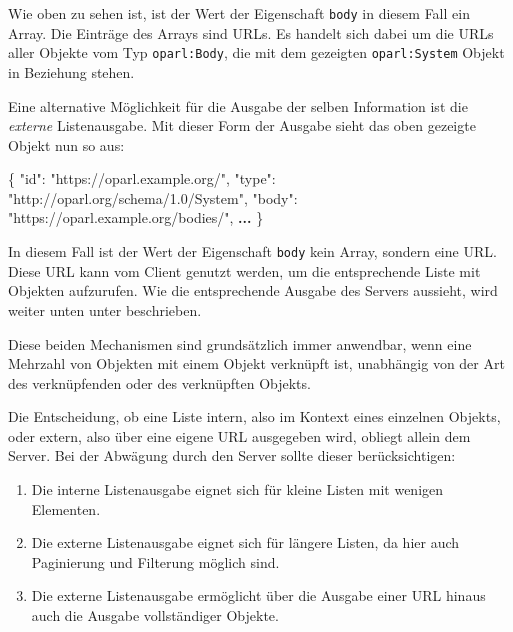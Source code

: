 \documentclass[,a4paper]{article}
\newenvironment{Shaded}{}{}
\newcommand{\DataTypeTok}[1]{\textcolor[rgb]{0.56,0.13,0.00}{{#1}}}
\newcommand{\StringTok}[1]{\textcolor[rgb]{0.25,0.44,0.63}{{#1}}}
\newcommand{\FunctionTok}[1]{\textcolor[rgb]{0.02,0.16,0.49}{{#1}}}
\newcommand{\ErrorTok}[1]{\textcolor[rgb]{1.00,0.00,0.00}{\textbf{{#1}}}}
\begin{document}
Wie oben zu sehen ist, ist der Wert der Eigenschaft \texttt{body} in
diesem Fall ein Array. Die Einträge des Arrays sind URLs. Es handelt
sich dabei um die URLs aller Objekte vom Typ \texttt{oparl:Body}, die
mit dem gezeigten \texttt{oparl:System} Objekt in Beziehung stehen.

Eine alternative Möglichkeit für die Ausgabe der selben Information ist
die \emph{externe} Listenausgabe. Mit dieser Form der Ausgabe sieht das
oben gezeigte Objekt nun so aus:

\begin{Shaded}
\begin{Highlighting}[]
\FunctionTok{\{}
    \DataTypeTok{"id"}\FunctionTok{:} \StringTok{"https://oparl.example.org/"}\FunctionTok{,}
    \DataTypeTok{"type"}\FunctionTok{:} \StringTok{"http://oparl.org/schema/1.0/System"}\FunctionTok{,}
    \DataTypeTok{"body"}\FunctionTok{:} \StringTok{"https://oparl.example.org/bodies/"}\FunctionTok{,}
    \ErrorTok{...}
\FunctionTok{\}}
\end{Highlighting}
\end{Shaded}

In diesem Fall ist der Wert der Eigenschaft \texttt{body} kein Array,
sondern eine URL. Diese URL kann vom Client genutzt werden, um die
entsprechende Liste mit Objekten aufzurufen. Wie die entsprechende
Ausgabe des Servers aussieht, wird weiter unten unter beschrieben.

Diese beiden Mechanismen sind grundsätzlich immer anwendbar, wenn eine
Mehrzahl von Objekten mit einem Objekt verknüpft ist, unabhängig von der
Art des verknüpfenden oder des verknüpften Objekts.

Die Entscheidung, ob eine Liste intern, also im Kontext eines einzelnen
Objekts, oder extern, also über eine eigene URL ausgegeben wird, obliegt
allein dem Server. Bei der Abwägung durch den Server sollte dieser
berücksichtigen:

\begin{enumerate}
\def\labelenumi{\arabic{enumi}.}
\item
  Die interne Listenausgabe eignet sich für kleine Listen mit wenigen
  Elementen.
\item
  Die externe Listenausgabe eignet sich für längere Listen, da hier auch
  Paginierung und Filterung möglich sind.
\item
  Die externe Listenausgabe ermöglicht über die Ausgabe einer URL hinaus
  auch die Ausgabe vollständiger Objekte.
\end{enumerate}
\end{document}
